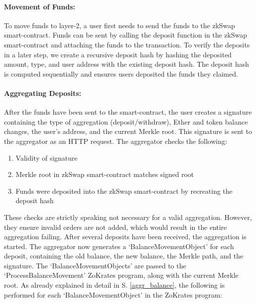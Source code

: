 \documentclass[../../thesis.tex]{subfiles}
\begin{document}
\paragraph{Movement of Funds:}
To move funds to layer-2, a user first needs to send the funds to the zkSwap smart-contract. Funds can be sent by calling the deposit function in the zkSwap smart-contract and attaching the funds to the transaction. To verify the deposits in a later step, we create a recursive deposit hash by hashing the deposited amount, type, and user address with the existing deposit hash. The deposit hash is computed sequentially and ensures users deposited the funds they claimed.

\paragraph{Aggregating Deposits:} \label{aggr_deps}
After the funds have been sent to the smart-contract, the user creates a signature containing the type of aggregation (deposit/withdraw), Ether and token balance changes, the user's address, and the current Merkle root. This signature is sent to the aggregator as an HTTP request. The aggregator checks the following: 

\begin{enumerate}
    \item Validity of signature
    \item Merkle root in zkSwap smart-contract matches signed root
    \item Funds were deposited into the zkSwap smart-contract by recreating the deposit hash
\end{enumerate}

These checks are strictly speaking not necessary for a valid aggregation. However, they ensure invalid orders are not added, which would result in the entire aggregation failing. After several deposits have been received, the aggregation is started. The aggregator now generates a `BalanceMovementObject' for each deposit, containing the old balance, the new balance, the Merkle path, and the signature. The `BalanceMovementObjects' are passed to the `ProcessBalanceMovement' ZoKrates program, along with the current Merkle root. As already explained in detail in S. \ref{aggr_balance}, the following is performed for each `BalanceMovementObject' in the ZoKrates program:
\end{document}

